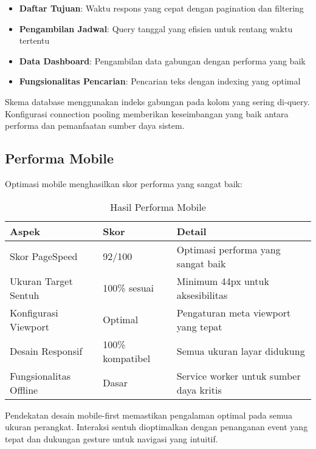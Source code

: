 \begin{itemize}
\item \textbf{Daftar Tujuan}: Waktu respons yang cepat dengan pagination dan filtering
\item \textbf{Pengambilan Jadwal}: Query tanggal yang efisien untuk rentang waktu tertentu
\item \textbf{Data Dashboard}: Pengambilan data gabungan dengan performa yang baik
\item \textbf{Fungsionalitas Pencarian}: Pencarian teks dengan indexing yang optimal
\end{itemize}

Skema database menggunakan indeks gabungan pada kolom yang sering di-query. Konfigurasi connection pooling memberikan keseimbangan yang baik antara performa dan pemanfaatan sumber daya sistem.

\subsection{Performa Mobile}

Optimasi mobile menghasilkan skor performa yang sangat baik:

\begin{table}[ht]
\centering
\caption{Hasil Performa Mobile}
\label{tab:mobile-performance}
\footnotesize
\begin{adjustbox}{width=\textwidth,center}
\begin{tabular}{@{}p{4cm}p{3cm}p{6cm}@{}}
\toprule
\textbf{Aspek} & \textbf{Skor} & \textbf{Detail} \\
\midrule
Skor PageSpeed & 92/100 & Optimasi performa yang sangat baik \\
\hline
Ukuran Target Sentuh & 100\% sesuai & Minimum 44px untuk aksesibilitas \\
\hline
Konfigurasi Viewport & Optimal & Pengaturan meta viewport yang tepat \\
\hline
Desain Responsif & 100\% kompatibel & Semua ukuran layar didukung \\
\hline
Fungsionalitas Offline & Dasar & Service worker untuk sumber daya kritis \\
\bottomrule
\end{tabular}
\end{adjustbox}
\end{table}

Pendekatan desain mobile-first memastikan pengalaman optimal pada semua ukuran perangkat. Interaksi sentuh dioptimalkan dengan penanganan event yang tepat dan dukungan gesture untuk navigasi yang intuitif.

